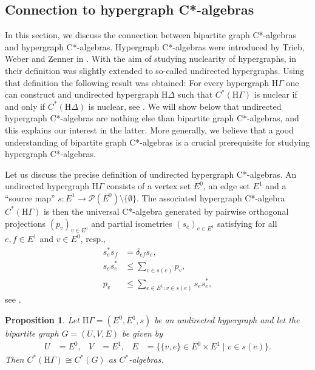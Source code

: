 \documentclass[a4paper]{amsart}
\newtheorem{proposition}[thm]{Proposition}
\newcommand{\Ha}{\mathrm{H}}
\begin{document}
\subsection{Connection to hypergraph C*-algebras}

In this section, we discuss the connection between bipartite graph C*-algebras and hypergraph C*-algebras. Hypergraph C*-algebras were introduced by Trieb, Weber and Zenner in \cite{trieb_hypergraph_2024}. With the aim of studying nuclearity of hypergraphs, in \cite{schafer_nuclearity_2024} their definition was slightly extended to so-called undirected hypergraphs. Using that definition the following result was obtained: For every hypergraph $\Ha\Gamma$ one can construct and undirected hypergraph $\Ha\Delta$ such that $C^\ast(\Ha\Gamma)$ is nuclear if and only if $C^\ast(\Ha\Delta)$ is nuclear, see \cite[Theorem 2.5]{schafer_nuclearity_2024}. We will show below that undirected hypergraph C*-algebras are nothing else than bipartite graph C*-algebras, and this explains our interest in the latter. More generally, we believe that a good understanding of bipartite graph C*-algebras is a crucial prerequisite for studying hypergraph C*-algebras.

Let us discuss the precise definition of undirected hypergraph C*-algebras. An undirected hypergraph $\Ha\Gamma$ consists of a vertex set $E^0$, an edge set $E^1$ 
and a ``source map'' $s: E^1 \to \mathcal{P}(E^0) \setminus \{\emptyset\}$. 
The associated hypergraph C*-algebra $C^\ast(\Ha\Gamma)$ is then the universal C*-algebra generated by pairwise orthogonal projections $(p_v)_{v \in E^0}$ and partial isometries $(s_e)_{e \in E^1}$ satisfying for all $e, f \in E^1$ and $v \in E^0$, resp.,
\begin{align*}
    s_e^\ast s_f &= \delta_{ef} s_e, \tag{HR1} \\
    s_e s_e^\ast &\leq \sum_{v \in s(e)} p_v, \tag{HR2} \\
    p_v &\leq \sum_{e \in E^1: v \in s(e)} s_e s_e^\ast, \tag{HR3}
\end{align*}
see \cite[Definition 2.2]{schafer_nuclearity_2024}.

\begin{proposition}
    \label{bga::prop:connection_to_hypergraph_algebras}
    Let $\Ha\Gamma = (E^0, E^1, s)$ be an undirected hypergraph and let the bipartite graph $G = (U, V, E)$ be given by
    \begin{align*}
        U &= E^0, & V &= E^1, & E &= \{\{v, e\} \in E^0 \times E^1\mid v \in s(e)\}.
    \end{align*}
    Then $C^\ast(\Ha\Gamma) \cong C^\ast(G)$ as $C^\ast$-algebras.
\end{proposition}
\end{document}
